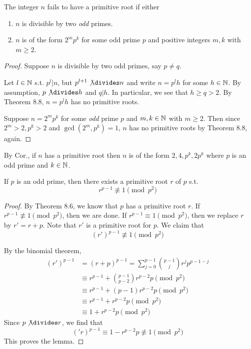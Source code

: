 \begin{corollary}
    The integer $n$ fails to have a primitive root if either
    \begin{enumerate}
        \item $n$ is divisible by two \emph{odd} primes.
        \item $n$ is of the form $2^m p^k$ for some odd prime $p$ and positive
        integers $m, k$ with $m \geq 2$.
    \end{enumerate}
\end{corollary}
\begin{proof}
    Suppose $n$ is divisible by two odd primes, say $p \neq q$.

    Let $l \in \mathbb{N}$ s.t. $p^l | n$, but $p^{l+1} \not \divides  n$ and write $n=p^l h$ for 
    some $h \in \mathbb{N}$. 
    By assumption, $p \not \divides  h$ and $q | h$. 
    In particular, we see that $h \geq q > 2$.
    By Theorem 8.8, $n = p^l h$ has no primitive roots.

    Suppose $n = 2^m p^k$ for some \emph{odd} prime $p$ and $m, k \in \mathbb{N}$ with 
    $m \geq 2$.
    Then since $2^m > 2, p^k > 2$ and $\gcd(2^m, p^k) = 1$, $n$ has no 
    primitive roots by Theorem 8.8, again.
\end{proof}

\begin{remark}
    By Cor., if $n$ has a primitive root then $n$ is of the form $2, 4, p^k, 2p^k$
    where $p$ is an odd prime and $k \in \mathbb{N}$.
\end{remark}
\setcounter{lemma}{0}
\begin{lemma}
    If $p$ is an odd prime, then there exists a primitive root $r$ of $p$ s.t.
    \[
        r^{p-1} \not\equiv 1 \pmod {p^2}
    \]
\end{lemma}
\begin{proof}
    By Theorem 8.6, we know that $p$ has a primitive root $r$.
    If $r^{p-1} \not\equiv 1 \pmod {p^2}$, then we are done.
    If $r^{p-1} \equiv 1 \pmod {p^2}$, then we replace $r$ by
    $r\prime = r + p$. Note that $r\prime$ is a primitive root for $p$.
    We claim that 
    \[
        {(r\prime)}^{p-1} \not\equiv 1 \pmod {p^2}
    \]

    By the binomial theorem,
    \[
        \begin{aligned}
            {(r\prime)}^{p-1} &= {(r + p)}^{p-1} = \sum_{j=0}^{p-1} {p-1 \choose j} r^j p^{p-1-j}\\
            &\equiv r^{p-1} + {p-1 \choose p-2} r^{p-2} p \pmod {p^2}\\
            &\equiv r^{p-1} + (p-1) r^{p-2} p \pmod {p^2}\\
            &\equiv r^{p-1} + r^{p-2} p \pmod {p^2}\\
            &\equiv 1 + r^{p-2} p \pmod {p^2}
        \end{aligned}
    \]
    Since $p \not \divides  r$, we find that
    \[
        {(\prime r)}^{p-1} \equiv 1 - r^{p-2} p \not\equiv 1 \pmod {p^2}
    \]
    This proves the lemma.
\end{proof}

